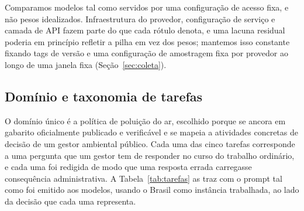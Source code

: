 Comparamos modelos tal como servidos por uma configuração de acesso fixa, e não
pesos idealizados. Infraestrutura do provedor, configuração de serviço e camada
de API fazem parte do que cada rótulo denota, e uma lacuna residual poderia em
princípio refletir a pilha em vez dos pesos; mantemos isso constante fixando
tags de versão e uma configuração de amostragem fixa por provedor ao longo de
uma janela fixa (Seção~\ref{sec:coleta}).

\subsection{Domínio e taxonomia de tarefas}
\label{sec:tarefas}

O domínio único é a política de poluição do ar, escolhido porque se ancora em
gabarito oficialmente publicado e verificável e se mapeia a atividades concretas
de decisão de um gestor ambiental público. Cada uma das cinco tarefas
corresponde a uma pergunta que um gestor tem de responder no curso do trabalho
ordinário, e cada uma foi redigida de modo que uma resposta errada carregasse
consequência administrativa. A Tabela~\ref{tab:tarefas} as traz com o prompt
tal como foi emitido aos modelos, usando o Brasil como instância trabalhada, ao
lado da decisão que cada uma representa.

